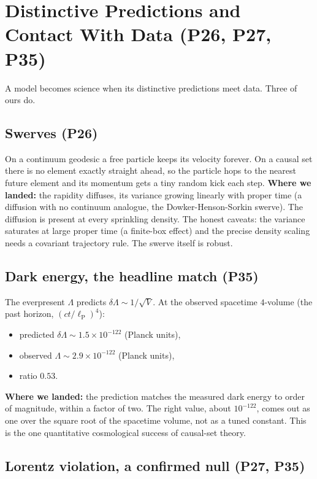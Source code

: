 \section{Distinctive Predictions and Contact With Data (P26, P27, P35)}
\label{sec:predictions}

A model becomes science when its distinctive predictions meet data. Three of ours do.

\subsection{Swerves (P26)}

On a continuum geodesic a free particle keeps its velocity forever. On a causal set
there is no element exactly straight ahead, so the particle hops to the nearest future
element and its momentum gets a tiny random kick each step. \textbf{Where we landed:}
the rapidity diffuses, its variance growing linearly with proper time (a diffusion with
no continuum analogue, the Dowker-Henson-Sorkin swerve). The diffusion is present at
every sprinkling density. The honest caveats: the variance saturates at large proper
time (a finite-box effect) and the precise density scaling needs a covariant trajectory
rule. The swerve itself is robust.

\subsection{Dark energy, the headline match (P35)}

The everpresent $\Lambda$ predicts $\delta\Lambda \sim 1/\sqrt{V}$. At the observed
spacetime $4$-volume (the past horizon, $(ct/\ell_{\mathrm{P}})^4$):
\begin{itemize}
\item predicted $\delta\Lambda \sim 1.5\times10^{-122}$ (Planck units),
\item observed $\Lambda \sim 2.9\times10^{-122}$ (Planck units),
\item ratio $0.53$.
\end{itemize}
\textbf{Where we landed:} the prediction matches the measured dark energy to order of
magnitude, within a factor of two. The right value, about $10^{-122}$, comes out as one
over the square root of the spacetime volume, not as a tuned constant. This is the one
quantitative cosmological success of causal-set theory.

\subsection{Lorentz violation, a confirmed null (P27, P35)}

